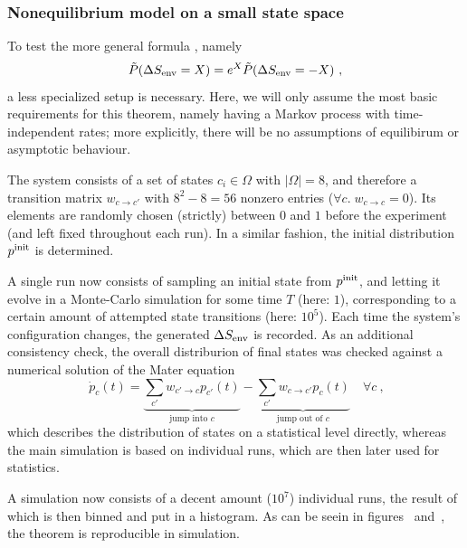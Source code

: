 \subsubsection{Nonequilibrium model on a small state space}

To test the more general formula , namely
%
\begin{equation*}
	\tilde P(\Delta S_\text{env} = X) = e^X \tilde P(\Delta S_\text{env} = -X) ~,
\end{equation*}
%
a less specialized setup is necessary. Here, we will only assume the most basic requirements for this theorem, namely having a Markov process with time-independent rates; more explicitly, there will be no assumptions of equilibirum or asymptotic behaviour.

The system consists of a set of states \(c_i\in\Omega\) with \(|\Omega| = 8\), and therefore a transition matrix \(w_{c\to c'}\) with \(8^2-8 = 56\) nonzero entries (\(\forall c.\;w_{c\to c} = 0\)). Its elements are randomly chosen (strictly) between \(0\) and \(1\) before the experiment (and left fixed throughout each run). In a similar fashion, the initial distribution \(p^{\text{init}}\) is determined.

A single run now consists of sampling an initial state from \(p^{\text{init}}\), and letting it evolve in a Monte-Carlo simulation for some time \(T\) (here: \(1\)), corresponding to a certain amount of attempted state transitions (here: \(10^5\)). Each time the system's configuration changes, the generated \(\Delta S_\text{env}\) is recorded. As an additional consistency check, the overall distriburion of final states was checked against a numerical solution of the Mater equation
%
\begin{equation}
	\;\dot p_c(t) = \underbrace{\sum_{c'}w_{c'\to c}p_{c'}(t)}_{\text{jump into } c} - \underbrace{\sum_{c'} w_{c\to c'}p_{c}(t)}_{\text{jump out of } c}
	\quad\forall c %
	~,
\end{equation}
%
which describes the distribution of states on a statistical level directly, whereas the main simulation is based on individual runs, which are then later used for statistics.


A simulation now consists of a decent amount (\(10^7\)) individual runs, the result of which is then binned and put in a histogram. As can be seein in figures ~and~, the theorem is reproducible in simulation.


